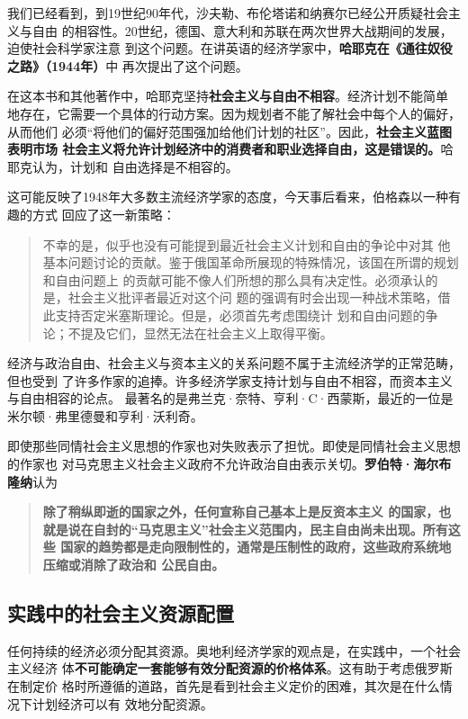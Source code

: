我们已经看到，到19世纪90年代，沙夫勒、布伦塔诺和纳赛尔已经公开质疑社会主义与自由
的相容性。20世纪，德国、意大利和苏联在两次世界大战期间的发展，迫使社会科学家注意
到这个问题。在讲英语的经济学家中，\textbf{哈耶克在《通往奴役之路》（1944年）}中
再次提出了这个问题。

在这本书和其他著作中，哈耶克坚持\textbf{社会主义与自由不相容}。经济计划不能简单
地存在，它需要一个具体的行动方案。因为规划者不能了解社会中每个人的偏好，从而他们
必须“将他们的偏好范围强加给他们计划的社区”。因此，\textbf{社会主义蓝图表明市场
社会主义将允许计划经济中的消费者和职业选择自由，这是错误的。}哈耶克认为，计划和
自由选择是不相容的。

这可能反映了1948年大多数主流经济学家的态度，今天事后看来，伯格森以一种有趣的方式
回应了这一新策略：

\begin{quotation}不幸的是，似乎也没有可能提到最近社会主义计划和自由的争论中对其
他基本问题讨论的贡献。鉴于俄国革命所展现的特殊情况，该国在所谓的规划和自由问题上
的贡献可能不像人们所想的那么具有决定性。必须承认的是，社会主义批评者最近对这个问
题的强调有时会出现一种战术策略，借此支持否定米塞斯理论。但是，必须首先考虑围绕计
划和自由问题的争论；不提及它们，显然无法在社会主义上取得平衡。
\end{quotation}

经济与政治自由、社会主义与资本主义的关系问题不属于主流经济学的正常范畴，但也受到
了许多作家的追捧。许多经济学家支持计划与自由不相容，而资本主义与自由相容的论点。
最著名的是弗兰克·奈特、亨利·C·西蒙斯，最近的一位是米尔顿·弗里德曼和亨利·沃利奇。

即使那些同情社会主义思想的作家也对失败表示了担忧。即使是同情社会主义思想的作家也
对马克思主义社会主义政府不允许政治自由表示关切。\textbf{罗伯特·海尔布隆纳}认为
\begin{quotation} \textbf{除了稍纵即逝的国家之外，任何宣称自己基本上是反资本主义
的国家，也就是说在自封的“马克思主义”社会主义范围内，民主自由尚未出现。所有这些
国家的趋势都是走向限制性的，通常是压制性的政府，这些政府系统地压缩或消除了政治和
公民自由。}
\end{quotation}

\raggedbottom
\clearpage
\subsection{实践中的社会主义资源配置}

任何持续的经济必须分配其资源。奥地利经济学家的观点是，在实践中，一个社会主义经济
体\textbf{不可能确定一套能够有效分配资源的价格体系}。这有助于考虑俄罗斯在制定价
格时所遵循的道路，首先是看到社会主义定价的困难，其次是在什么情况下计划经济可以有
效地分配资源。

